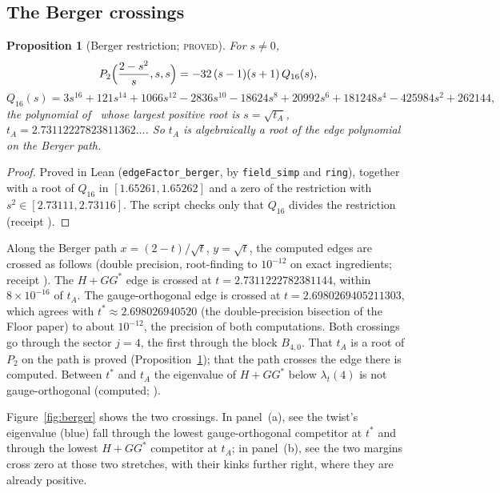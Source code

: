 \documentclass[11pt]{article}
\newtheorem{proposition}[theorem]{Proposition}
\theoremstyle{definition}
\theoremstyle{remark}
\newcommand{\PROVED}{\textsc{proved}}
\begin{document}
\subsection{The Berger crossings}\label{subsec:berger}

\begin{proposition}[Berger restriction; \PROVED]\label{prop:bergerrestriction}
For $s\ne0$,
\[
  P_2\Bigl(\frac{2-s^2}{s},s,s\Bigr)=-32\,(s-1)(s+1)\,Q_{16}(s),
\]
\[
  Q_{16}(s)=3s^{16}+121s^{14}+1066s^{12}-2836s^{10}-18624s^8+20992s^6+181248s^4-425984s^2+262144 ,
\]
the polynomial of~\cite[Remark ``Below the range'']{davisfloor2026} whose largest positive root is $s=\sqrt{t_A}$,
$t_A=2.73112227823811362\ldots$. So $t_A$ is algebraically a root of the edge polynomial on the Berger path.
\end{proposition}
\begin{proof}
Proved in Lean (\texttt{edgeFactor\_berger}, by \texttt{field\_simp} and \texttt{ring}), together with a root of
$Q_{16}$ in $[1.65261,1.65262]$ and a zero of the restriction with $s^2\in[2.73111,2.73116]$. The script
 checks only that $Q_{16}$ divides the restriction (receipt
).
\end{proof}

Along the Berger path $x=(2-t)/\sqrt t$, $y=\sqrt t$, the computed edges are crossed as follows (double precision,
root-finding to $10^{-12}$ on exact ingredients; receipt ). The $H+GG^*$ edge is crossed at
$t=2.7311222782381144$, within $8\times10^{-16}$ of $t_A$. The gauge-orthogonal edge is crossed at
$t=2.6980269405211303$, which agrees with $t^*\approx2.698026940520$ (the double-precision bisection of the Floor paper)
to about $10^{-12}$, the precision of both computations. Both crossings go through the sector $j=4$, the first through
the block $B_{4,0}$. That $t_A$ is a root of $P_2$ on the path is proved (Proposition~\ref{prop:bergerrestriction}); that
the path crosses the edge there is computed. Between $t^*$ and $t_A$ the eigenvalue of $H+GG^*$ below $\lambda_t(4)$ is
not gauge-orthogonal (computed; \cite[Remark ``Below the range'']{davisfloor2026}).

Figure~\ref{fig:berger} shows the two crossings. In panel~(a), see the twist's eigenvalue (blue) fall through the lowest
gauge-orthogonal competitor at $t^*$ and through the lowest $H+GG^*$ competitor at $t_A$; in panel~(b), see the two
margins cross zero at those two stretches, with their kinks further right, where they are already positive.
\end{document}
